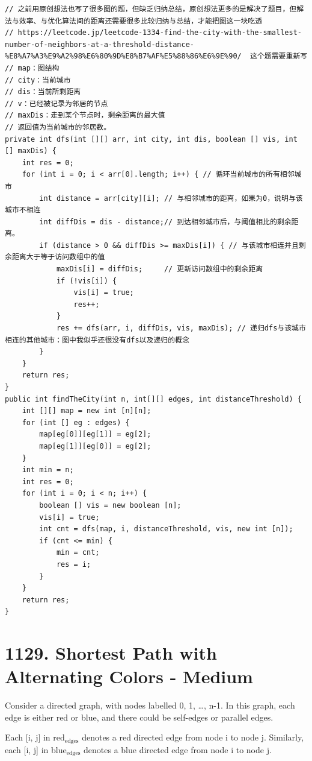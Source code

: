 \documentclass[9pt, b5paaper]{book}
\begin{document}
\begin{verbatim}
// 之前用原创想法也写了很多图的题，但缺乏归纳总结，原创想法更多的是解决了题目，但解法与效率、与优化算法间的距离还需要很多比较归纳与总结，才能把图这一块吃透
// https://leetcode.jp/leetcode-1334-find-the-city-with-the-smallest-number-of-neighbors-at-a-threshold-distance-%E8%A7%A3%E9%A2%98%E6%80%9D%E8%B7%AF%E5%88%86%E6%9E%90/  这个题需要重新写
// map：图结构
// city：当前城市
// dis：当前所剩距离
// v：已经被记录为邻居的节点
// maxDis：走到某个节点时，剩余距离的最大值
// 返回值为当前城市的邻居数。
private int dfs(int [][] arr, int city, int dis, boolean [] vis, int [] maxDis) {
    int res = 0;
    for (int i = 0; i < arr[0].length; i++) { // 循环当前城市的所有相邻城市
        int distance = arr[city][i]; // 与相邻城市的距离，如果为0，说明与该城市不相连
        int diffDis = dis - distance;// 到达相邻城市后，与阈值相比的剩余距离。
        if (distance > 0 && diffDis >= maxDis[i]) { // 与该城市相连并且剩余距离大于等于访问数组中的值
            maxDis[i] = diffDis;     // 更新访问数组中的剩余距离   
            if (!vis[i]) {
                vis[i] = true;
                res++;
            }
            res += dfs(arr, i, diffDis, vis, maxDis); // 递归dfs与该城市相连的其他城市：图中我似乎还很没有dfs以及递归的概念
        }
    }
    return res;
}
public int findTheCity(int n, int[][] edges, int distanceThreshold) {
    int [][] map = new int [n][n];
    for (int [] eg : edges) {
        map[eg[0]][eg[1]] = eg[2];
        map[eg[1]][eg[0]] = eg[2];
    }
    int min = n;
    int res = 0;
    for (int i = 0; i < n; i++) {
        boolean [] vis = new boolean [n];
        vis[i] = true;
        int cnt = dfs(map, i, distanceThreshold, vis, new int [n]);
        if (cnt <= min) {
            min = cnt;
            res = i;
        }
    }
    return res;
}
\end{verbatim}

\section{1129. Shortest Path with Alternating Colors - Medium}
\label{sec-7-3}
Consider a directed graph, with nodes labelled 0, 1, \ldots{}, n-1.  In this graph, each edge is either red or blue, and there could be self-edges or parallel edges.

Each [i, j] in red$_{\text{edges}}$ denotes a red directed edge from node i to node j.  Similarly, each [i, j] in blue$_{\text{edges}}$ denotes a blue directed edge from node i to node j.
\end{document}
